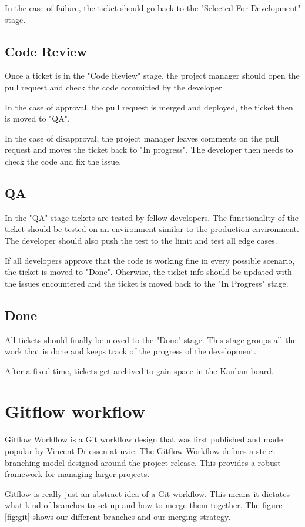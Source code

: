 \begin{spacing}{1.2}
In the case of failure, the ticket should go back to the "Selected For Development" stage.
\subsection{Code Review}
Once a ticket is in the "Code Review" stage, the project manager should open the pull request and check the code committed by the developer.

In the case of approval, the pull request is merged and deployed, the ticket then is moved to "QA".


In the case of disapproval, the project manager leaves comments on the pull request and moves the ticket back to "In progress". The developer then needs to check the code and fix the issue.
\subsection{QA}
In the "QA" stage tickets are tested by fellow developers. The functionality of the ticket should be tested on an environment similar to the production environment. The developer should also push the test to the limit and test all edge cases.

If all developers approve that the code is working fine in every possible scenario, the ticket is moved to "Done". Oherwise, the ticket info should be updated with the issues encountered and the ticket is moved back to the "In Progress" stage.

\subsection{Done}
All tickets should finally be moved to the "Done" stage. This stage groups all the work that is done and keeps track of the progress of the development.


After a fixed time, tickets get archived to gain space in the Kanban board.

\section{Gitflow workflow }
Gitflow Workflow is a Git workflow design that was first published and made popular by Vincent Driessen at nvie. The Gitflow Workflow defines a strict branching model designed around the project release. This provides a robust framework for managing larger projects.

Gitflow is really just an abstract idea of a Git workflow. This means it dictates what kind of branches to set up and how to merge them together.
The figure \ref{fig:git} shows our different branches and our merging strategy.


\end{spacing}
